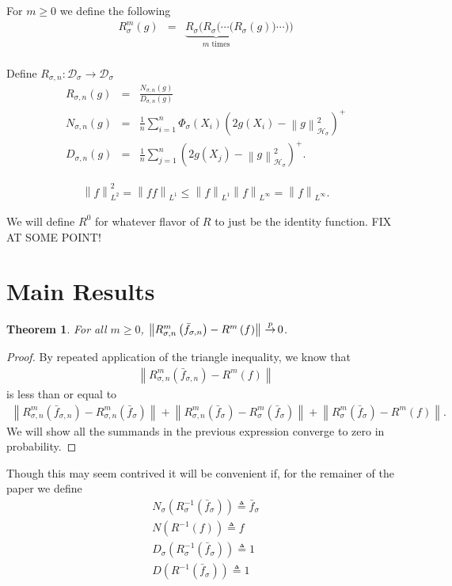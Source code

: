 \documentclass{article} %
\def\hsig{{\mathcal{H}_\sigma}}
\def\dsig{{\mathcal{D}_\sigma}}
\def\kde{{\bar{f}_{\sigma,n}}} %
\def\gkde{{\bar{f}_\sigma}} %
\def\fm{{\Phi_\sigma}} %
\def\cip{\,{\buildrel p \over \rightarrow}\,}
\def\irwl{{R_{\sigma,n}}}
\def\irwlm{{R_{\sigma,n}^{m}}}
\def\girwlm{{R_{\sigma}^m}}
\def\l{\left}
\def\r{\right}
\newtheorem{thm}{Theorem}
\theoremstyle{definition}
\begin{document}
For $m\ge 0 $ we define the following
\begin{eqnarray*}
	R_\sigma^m(g) &=& \underbrace{R_\sigma(R_\sigma(\cdots (R_\sigma}_{m \text{ times}}(g)) \cdots )) \\
\end{eqnarray*}

Define $\irwl: \dsig \to \dsig$
\begin{eqnarray} \label{eqn:irwl}
	\irwl\left( g \right) &=& \frac{N_{\sigma,n}\left( g \right)}{D_{\sigma,n}(g)}\\
	N_{\sigma,n}(g) &=& \frac{1}{n}\sum_{i=1}^n \fm\left( X_i \right) \left( 2g\left( X_i \right) - \l\|g\r\|_\hsig^2 \right)^+\\
	D_{\sigma,n}\left( g \right) &=& \frac{1}{n}\sum_{j=1}^n  \left( 2g\left( X_j \right) - \l\|g\r\|_\hsig^2 \right)^+.
\end{eqnarray}

\begin{eqnarray*}
	\l\|f\r\|^2_{L^2} = \l\|ff\r\|_{L^1}\le \l\|f\r\|_{L^1} \l\|f\r\|_{L^\infty} = \l\|f\r\|_{L^\infty}.
\end{eqnarray*}

We will define $R^0$ for whatever flavor of $R$ to just be the identity function.  FIX AT SOME POINT!

\section{Main Results}

\begin{thm}\label{thm:main}
	For all $m\ge 0$, $\l\|\irwlm\left(\kde  \right) - R^m\left( f \right) \r\|\cip 0$.
\end{thm}
\begin{proof}
	By repeated application of the triangle inequality, we know that
	\begin{eqnarray*}
		\l\|\irwlm\left(\kde  \right) - R^m\left( f \right) \r\|
	\end{eqnarray*}
	is less than or equal to
	\begin{eqnarray*}
		 \l\|\irwlm\left( \kde \right) - \irwlm\left( \gkde \right) \r\| + \l\| \irwlm\left( \gkde \right)- \girwlm\left( \gkde \right)  \r\| + \l\|\girwlm\left( \gkde \right) - R^m \left( f \right)\r\|.
	\end{eqnarray*}
	We will show all the summands in the previous expression converge to zero in probability.
\end{proof}

Though this may seem contrived it will be convenient if, for the remainer of the paper we define
\begin{eqnarray*}
	N_\sigma\left( R_{\sigma}^{-1}\left( \gkde \right) \right) \triangleq \gkde\\
	N\left( R^{-1}\left( f \right) \right) \triangleq f\\
	D_\sigma\left( R_{\sigma}^{-1}\left( \gkde \right) \right) \triangleq 1\\
	D\left( R^{-1}\left( \gkde \right) \right) \triangleq 1
\end{eqnarray*}
\end{document}
